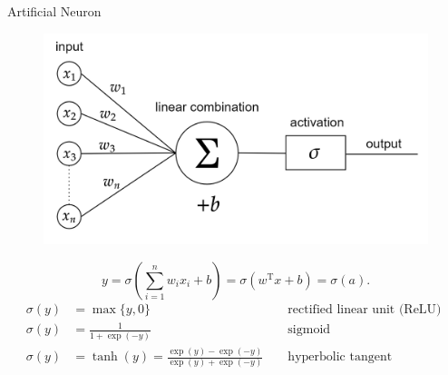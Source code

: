 \documentclass[9pt]{beamer}
\begin{document}
\begin{frame}{Artificial Neuron}
    \begin{figure}[H]
        \begin{center}
            \includegraphics[scale=0.15]{img/diagram-20220205_1.png}
        \end{center}
    \end{figure}
    \begin{equation*}
        y = \sigma \left( \sum^{n}_{i=1} w_i x_i + b \right) = \sigma \left( w^{\mathrm{T}} x + b \right) = \sigma(a).
    \end{equation*}
    \begin{equation*}
        \begin{aligned}
            \sigma(y) &=\max \{y, 0\} & & \text{ rectified linear unit (ReLU) } \\
            \sigma(y) &=\frac{1}{1+\exp (-y)} & & \text{ sigmoid }  \\
            \sigma(y) &=\tanh (y)=\frac{\exp (y)-\exp (-y)}{\exp (y)+\exp (-y)} & & \text{ hyperbolic tangent }
        \end{aligned}
    \end{equation*}
\end{frame}
\end{document}
